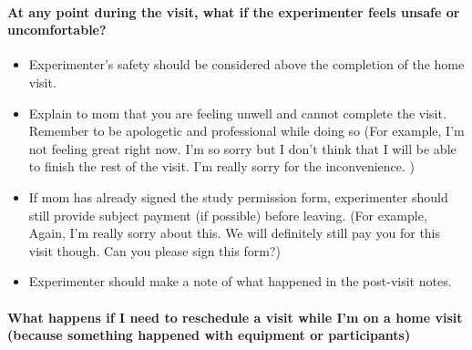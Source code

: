 \documentclass[
  12pt,
]{book}
\providecommand{\tightlist}{%
  \setlength{\itemsep}{0pt}\setlength{\parskip}{0pt}}
\begin{document}
\hypertarget{at-any-point-during-the-visit-what-if-the-experimenter-feels-unsafe-or-uncomfortable}{%
\paragraph*{At any point during the visit, what if the experimenter feels unsafe or uncomfortable?}\label{at-any-point-during-the-visit-what-if-the-experimenter-feels-unsafe-or-uncomfortable}}

\begin{itemize}
\tightlist
\item
  Experimenter's safety should be considered above the completion of the home visit.\\
\item
  Explain to mom that you are feeling unwell and cannot complete the visit. Remember to be apologetic and professional while doing so (For example, I'm not feeling great right now. I'm so sorry but I don't think that I will be able to finish the rest of the visit. I'm really sorry for the inconvenience. )\\
\item
  If mom has already signed the study permission form, experimenter should still provide subject payment (if possible) before leaving. (For example, Again, I'm really sorry about this. We will definitely still pay you for this visit though. Can you please sign this form?)\\
\item
  Experimenter should make a note of what happened in the post-visit notes.
\end{itemize}

\hypertarget{what-happens-if-i-need-to-reschedule-a-visit-while-im-on-a-home-visit-because-something-happened-with-equipment-or-participants-1}{%
\paragraph*{What happens if I need to reschedule a visit while I'm on a home visit (because something happened with equipment or participants)}\label{what-happens-if-i-need-to-reschedule-a-visit-while-im-on-a-home-visit-because-something-happened-with-equipment-or-participants-1}}
\end{document}
